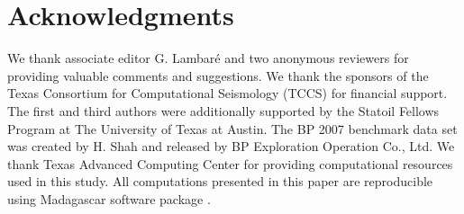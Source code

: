 \section{Acknowledgments}
We thank associate editor G. Lambar\'{e} and two anonymous reviewers for providing valuable comments and suggestions.
We thank the sponsors of the Texas Consortium for Computational Seismology (TCCS) for financial support.
The first and third authors were additionally supported by the Statoil Fellows Program at The University of Texas at Austin.
The BP 2007 benchmark data set was created by H. Shah and released by BP Exploration Operation Co., Ltd.
We thank Texas Advanced Computing Center for providing computational resources used in this study.
All computations presented in this paper are reproducible using Madagascar software package \cite[]{fomel13b}.
